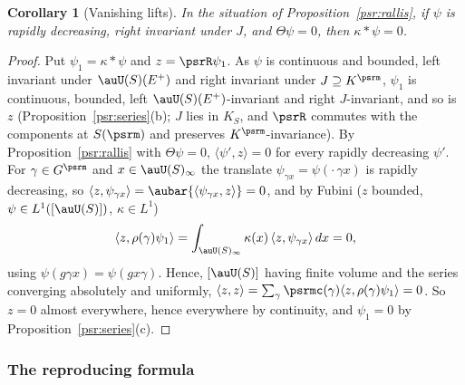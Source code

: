 \documentclass[10pt]{amsart}
\newtheorem{corollary}[theorem]{Corollary}
\theoremstyle{definition}
\theoremstyle{remark}
\begin{document}
\begin{corollary}[Vanishing lifts]\label{psr:vanish}
In the situation of Proposition~\ref{psr:rallis}, if $\psi$ is rapidly
decreasing, right invariant under $J$, and $\Theta\psi=0$, then $\kappa*\psi=0$.
\end{corollary}
\begin{proof}
Put $\psi_1=\kappa*\psi$ and $z=\psrR\psi_1$. As $\psi$ is continuous and bounded, left invariant under
$\auU(S)(E^+)$ and right invariant under $J\supseteq K^\psrm$, $\psi_1$ is continuous, bounded, left
$\auU(S)(E^+)$-invariant and right $J$-invariant, and so is $z$ (Proposition~\ref{psr:series}(b); $J$
lies in $K_S$, and $\psrR$ commutes with the components at $S(\psrm)$ and preserves $K^\psrm$-invariance).
By Proposition~\ref{psr:rallis} with $\Theta\psi=0$, $\langle\psi',z\rangle=0$ for every rapidly
decreasing $\psi'$. For $\gamma\in G^\psrm$ and $x\in\auU(S)_\infty$ the translate
$\psi_{\gamma x}=\psi(\cdot\,\gamma x)$ is rapidly decreasing, so $\langle z,\psi_{\gamma x}\rangle=
\aubar{\langle\psi_{\gamma x},z\rangle}=0$, and by Fubini ($z$ bounded, $\psi\in L^1([\auU(S)])$, $\kappa\in
L^1$)
\[
\langle z,\rho(\gamma)\psi_1\rangle=\int_{\auU(S)_\infty}\kappa(x)\,\langle z,\psi_{\gamma x}\rangle\,dx=0 ,
\]
using $\psi(g\gamma x)=\psi(gx\gamma)$. Hence, $[\auU(S)]$ having finite volume and the series converging
absolutely and uniformly, $\langle z,z\rangle=\sum_\gamma\psrmc(\gamma)\langle z,\rho(\gamma)\psi_1\rangle=0$.
So $z=0$ almost everywhere, hence everywhere by continuity, and $\psi_1=0$ by
Proposition~\ref{psr:series}(c).
\end{proof}

\subsubsection{The reproducing formula}\label{psr:ss-R}
\end{document}
